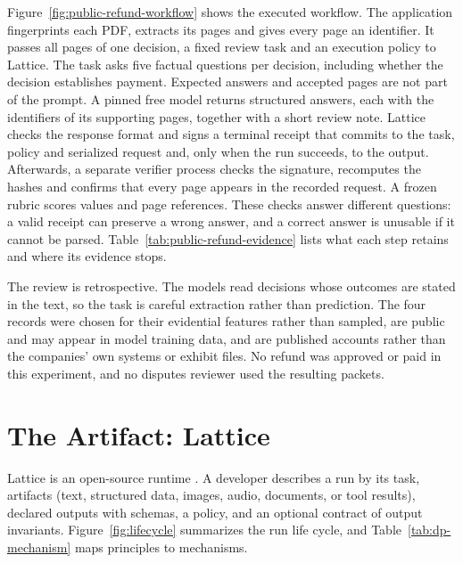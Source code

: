 \documentclass[11pt]{article}
\begin{document}


Figure~\ref{fig:public-refund-workflow} shows the executed workflow. The application fingerprints each PDF, extracts its pages and gives every page an identifier. It passes all pages of one decision, a fixed review task and an execution policy to Lattice. The task asks five factual questions per decision, including whether the decision establishes payment. Expected answers and accepted pages are not part of the prompt. A pinned free model returns structured answers, each with the identifiers of its supporting pages, together with a short review note. Lattice checks the response format and signs a terminal receipt that commits to the task, policy and serialized request and, only when the run succeeds, to the output. Afterwards, a separate verifier process checks the signature, recomputes the hashes and confirms that every page appears in the recorded request. A frozen rubric scores values and page references. These checks answer different questions: a valid receipt can preserve a wrong answer, and a correct answer is unusable if it cannot be parsed. Table~\ref{tab:public-refund-evidence} lists what each step retains and where its evidence stops.

The review is retrospective. The models read decisions whose outcomes are stated in the text, so the task is careful extraction rather than prediction. The four records were chosen for their evidential features rather than sampled, are public and may appear in model training data, and are published accounts rather than the companies' own systems or exhibit files. No refund was approved or paid in this experiment, and no disputes reviewer used the resulting packets.
\FloatBarrier

\section{The Artifact: Lattice}\label{sec:artifact}

Lattice is an open-source runtime \citep{lattice}. A developer describes a run by its task, artifacts (text, structured data, images, audio, documents, or tool results), declared outputs with schemas, a policy, and an optional contract of output invariants. Figure~\ref{fig:lifecycle} summarizes the run life cycle, and Table~\ref{tab:dp-mechanism} maps principles to mechanisms.
\end{document}

